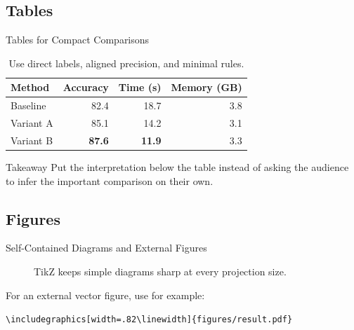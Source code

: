 \documentclass[10pt,aspectratio=169]{virgiling-slides}
\begin{document}
\subsection{Tables}

\begin{frame}{Tables for Compact Comparisons}
  \begin{table}
    \centering
    \caption{Use direct labels, aligned precision, and minimal rules.}
    \begin{tabular}{@{}lrrr@{}}
      \toprule
      Method & Accuracy & Time (s) & Memory (GB) \\
      \midrule
      Baseline & 82.4 & 18.7 & 3.8 \\
      Variant A & 85.1 & 14.2 & 3.1 \\
      Variant B & \textbf{87.6} & \textbf{11.9} & 3.3 \\
      \bottomrule
    \end{tabular}
  \end{table}

  \begin{exampleblock}{Takeaway}
    Put the interpretation below the table instead of asking the audience to
    infer the important comparison on their own.
  \end{exampleblock}
\end{frame}

\subsection{Figures}

\begin{frame}{Self-Contained Diagrams and External Figures}
  \begin{figure}
    \centering
    \caption{TikZ keeps simple diagrams sharp at every projection size.}
  \end{figure}

  For an external vector figure, use for example:
  \begin{center}
    \texttt{\textbackslash includegraphics[width=.82\textbackslash linewidth]\{figures/result.pdf\}}
  \end{center}
\end{frame}
\end{document}
